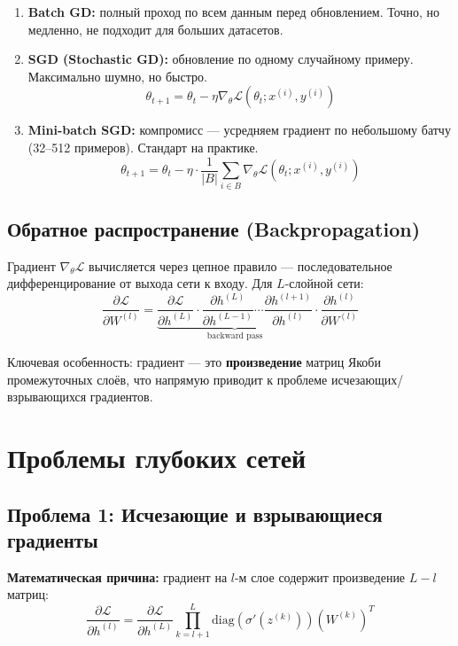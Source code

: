 \documentclass[a4paper,12pt]{article}
\begin{document}
\begin{enumerate}
    \item \textbf{Batch GD:} полный проход по всем данным перед обновлением. Точно, но медленно, не подходит для больших датасетов.
    \item \textbf{SGD (Stochastic GD):} обновление по одному случайному примеру. Максимально шумно, но быстро.
    \[
    \theta_{t+1} = \theta_t - \eta \nabla_\theta \mathcal{L}(\theta_t; x^{(i)}, y^{(i)})
    \]
    \item \textbf{Mini-batch SGD:} компромисс — усредняем градиент по небольшому батчу (32--512 примеров). Стандарт на практике.
    \[
    \theta_{t+1} = \theta_t - \eta \cdot \frac{1}{|B|} \sum_{i \in B} \nabla_\theta \mathcal{L}(\theta_t; x^{(i)}, y^{(i)})
    \]
\end{enumerate}

\subsection{Обратное распространение (Backpropagation)}

Градиент $\nabla_\theta \mathcal{L}$ вычисляется через цепное правило — последовательное дифференцирование от выхода сети к входу. Для $L$-слойной сети:
\[
\frac{\partial \mathcal{L}}{\partial W^{(l)}} = \underbrace{\frac{\partial \mathcal{L}}{\partial h^{(L)}} \cdot \frac{\partial h^{(L)}}{\partial h^{(L-1)}} \cdots \frac{\partial h^{(l+1)}}{\partial h^{(l)}}}_{\text{backward pass}} \cdot \frac{\partial h^{(l)}}{\partial W^{(l)}}
\]

Ключевая особенность: градиент — это \textbf{произведение} матриц Якоби промежуточных слоёв, что напрямую приводит к проблеме исчезающих/взрывающихся градиентов.

\section{Проблемы глубоких сетей}

\subsection{Проблема 1: Исчезающие и взрывающиеся градиенты}

\textbf{Математическая причина:} градиент на $l$-м слое содержит произведение $L-l$ матриц:
\[
\frac{\partial \mathcal{L}}{\partial h^{(l)}} = \frac{\partial \mathcal{L}}{\partial h^{(L)}} \prod_{k=l+1}^{L} \text{diag}(\sigma'(z^{(k)})) (W^{(k)})^T
\]
\end{document}
